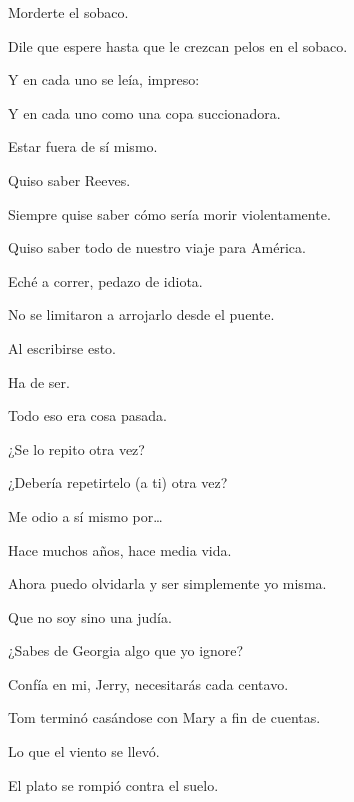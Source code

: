 \sk
Morderte el sobaco. \nb{}

\sk
Dile que espere hasta que le crezcan pelos en el sobaco. 

\sk
Y en cada uno se leía, impreso: 

\sk
Y en cada uno como una copa succionadora. 

\sk
Estar fuera de sí mismo. 

\sk
Quiso saber Reeves. 

\sk
Siempre quise saber cómo sería morir violentamente. 

\sk
Quiso saber todo de nuestro viaje para América. 

\sk
Eché a correr, pedazo de idiota.\nb{}

\sk
No se limitaron a arrojarlo desde el puente.\nb{}

\sk
Al escribirse esto. 

\sk
Ha de ser. 

\sk
Todo eso era cosa pasada. 

\sk
¿Se lo repito otra vez? 

\sk
¿Debería repetirtelo (a ti) otra vez?\nb{}

\sk
Me odio a sí mismo por\ldots{} 

\sk
Hace muchos años, hace media vida. 

\sk
Ahora puedo olvidarla y ser simplemente yo misma.\nb{}

\sk
Que no soy sino una judía. 

\sk
¿Sabes de Georgia algo que yo ignore? 

\sk
Confía en mi, Jerry, necesitarás cada centavo. 

\sk
Tom terminó casándose con Mary a fin de cuentas. 

\sk
Lo que el viento se llevó. 

\sk
El plato se rompió contra el suelo. \nb{}


